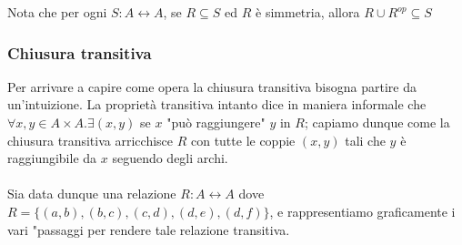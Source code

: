 \begin{note}
Nota che per ogni $S: A \longleftrightarrow A$, se $R \subseteq S$ ed $R$ è simmetria, allora $R \cup R^{op} \subseteq S$ 
\end{note}

\subsubsection{Chiusura transitiva}
Per arrivare a capire come opera la chiusura transitiva bisogna partire da un'intuizione. La proprietà transitiva intanto dice in maniera informale che $\forall x,y \in A \times A. \exists (x,y)$ se $x$ "può raggiungere" $y$ in $R$; capiamo dunque come la chiusura transitiva arricchisce $R$ con tutte le coppie $(x,y)$ tali che $y$ è raggiungibile da $x$ seguendo degli archi.\\ \\
Sia data dunque una relazione $R: A \leftrightarrow A$ dove $R = \{(a,b), (b,c), (c,d), (d,e), (d,f)\}$, e rappresentiamo graficamente i vari "passaggi per rendere tale relazione transitiva.

